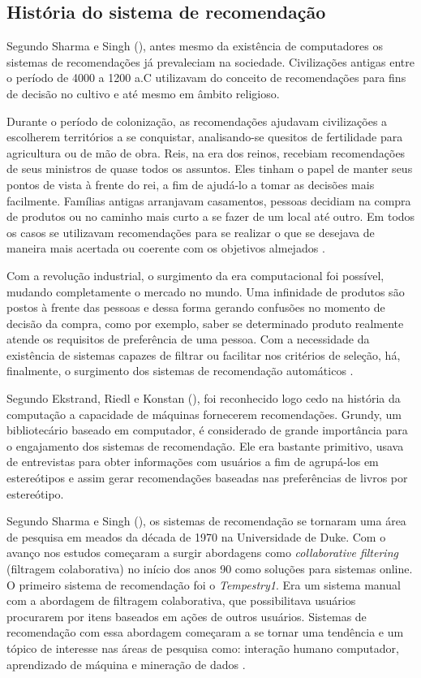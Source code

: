 \subsection{História do sistema de recomendação}

Segundo Sharma e Singh (\citeyear{Sharma:2016}), antes mesmo da existência de computadores os sistemas de recomendações já prevaleciam na sociedade. Civilizações antigas entre o período de 4000 a 1200 a.C utilizavam do conceito de recomendações para fins de decisão no cultivo e até mesmo em âmbito religioso.

Durante o período de colonização, as recomendações ajudavam civilizações a escolherem territórios a se conquistar, analisando-se quesitos de fertilidade para agricultura ou de mão de obra. Reis, na era dos reinos, recebiam recomendações de seus ministros de quase todos os assuntos. Eles tinham o papel de manter seus pontos de vista à frente do rei, a fim de ajudá-lo a tomar as decisões mais facilmente. Famílias antigas arranjavam casamentos, pessoas decidiam na compra de produtos ou no caminho mais curto a se fazer de um local até outro. Em todos os casos se utilizavam recomendações para se realizar o que se desejava de maneira mais acertada ou coerente com os objetivos almejados \cite{Sharma:2016}.

Com a revolução industrial, o surgimento da era computacional foi possível, mudando completamente o mercado no mundo. Uma infinidade de produtos são postos à frente das pessoas e dessa forma gerando confusões no momento de decisão da compra, como por exemplo, saber se determinado produto realmente atende os requisitos de preferência de uma pessoa. Com a necessidade da existência de sistemas capazes de filtrar ou facilitar nos critérios de seleção, há, finalmente, o surgimento dos sistemas de recomendação automáticos \cite{Sharma:2016}.

Segundo Ekstrand, Riedl e Konstan (\citeyear{Ekstrand:2011:CFR:2185827.2185828}), foi reconhecido logo cedo na história da computação a capacidade de máquinas fornecerem recomendações. Grundy, um bibliotecário baseado em computador, é considerado de grande importância para o engajamento dos sistemas de recomendação. Ele era bastante primitivo, usava de entrevistas para obter informações com usuários a fim de agrupá-los em estereótipos e assim gerar recomendações  baseadas nas preferências de livros por estereótipo.

Segundo Sharma e Singh (\citeyear{Sharma:2016}), os sistemas de recomendação se tornaram uma área de pesquisa em meados da década de 1970 na Universidade de Duke. Com o avanço nos estudos começaram a surgir abordagens como \textit{collaborative filtering} (filtragem colaborativa) no início dos anos 90 como soluções para sistemas online. O primeiro sistema de recomendação foi o \textit{Tempestry1}. Era um sistema manual com a abordagem de filtragem colaborativa, que possibilitava usuários procurarem por itens baseados em ações de outros usuários. Sistemas de recomendação com essa abordagem começaram a se tornar uma tendência e um tópico de interesse nas áreas de pesquisa como: interação humano computador, aprendizado de máquina e mineração de dados \cite{Ekstrand:2011:CFR:2185827.2185828}. 

